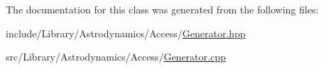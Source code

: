 The documentation for this class was generated from the following files\+:\begin{DoxyCompactItemize}
\item 
include/\+Library/\+Astrodynamics/\+Access/\hyperlink{_generator_8hpp}{Generator.\+hpp}\item 
src/\+Library/\+Astrodynamics/\+Access/\hyperlink{_generator_8cpp}{Generator.\+cpp}\end{DoxyCompactItemize}
